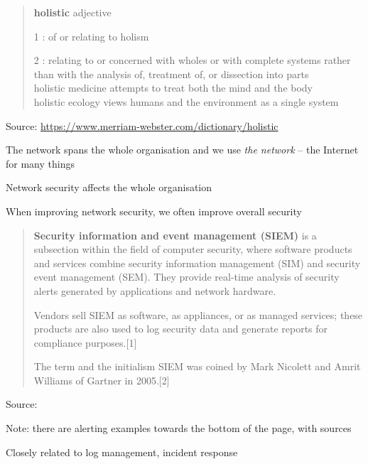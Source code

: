 \documentclass[Screen16to9,17pt]{foils}
\begin{document}
\begin{quote}
{\bf\Large holistic} adjective

\begin{list2}
\item[1]: of or relating to holism
\item[2] : relating to or concerned with wholes or with complete systems rather than with the analysis of, treatment of, or dissection into parts\\
holistic medicine attempts to treat both the mind and the body\\
holistic ecology views humans and the environment as a single system
\end{list2}
\end{quote}
Source: \url{https://www.merriam-webster.com/dictionary/holistic}

\begin{list2}
\item The network spans the whole organisation and we use \emph{the network} -- the Internet for many things
\item Network security affects the whole organisation
\item When improving network security, we often improve overall security
\end{list2}



\begin{quote}
{\bf Security information and event management (SIEM)} is a subsection within the field of computer security, where software products and services combine security information management (SIM) and security event management (SEM). They provide real-time analysis of security alerts generated by applications and network hardware.

  Vendors sell SIEM as software, as appliances, or as managed services; these products are also used to log security data and generate reports for compliance purposes.[1]

  The term and the initialism SIEM was coined by Mark Nicolett and Amrit Williams of Gartner in 2005.[2]
\end{quote}
Source: 

\begin{list2}
  \item Note: there are alerting examples towards the bottom of the page, with sources
  \item Closely related to log management, incident response
\end{list2}
\end{document}
